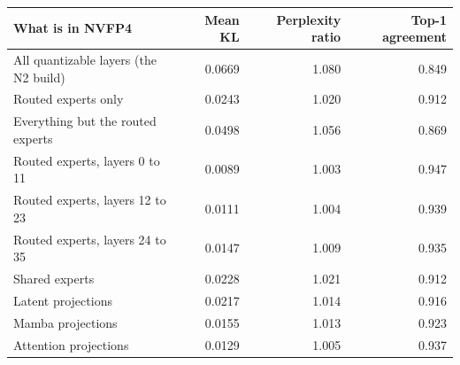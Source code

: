 \begin{tabular}{@{}lrrr@{}}
\toprule
What is in NVFP4 & Mean KL & Perplexity ratio & Top-1 agreement \\
\midrule
All quantizable layers (the N2 build) & 0.0669 & 1.080 & 0.849 \\
Routed experts only & 0.0243 & 1.020 & 0.912 \\
Everything but the routed experts & 0.0498 & 1.056 & 0.869 \\
Routed experts, layers 0 to 11 & 0.0089 & 1.003 & 0.947 \\
Routed experts, layers 12 to 23 & 0.0111 & 1.004 & 0.939 \\
Routed experts, layers 24 to 35 & 0.0147 & 1.009 & 0.935 \\
Shared experts & 0.0228 & 1.021 & 0.912 \\
Latent projections & 0.0217 & 1.014 & 0.916 \\
Mamba projections & 0.0155 & 1.013 & 0.923 \\
Attention projections & 0.0129 & 1.005 & 0.937 \\
\bottomrule
\end{tabular}
